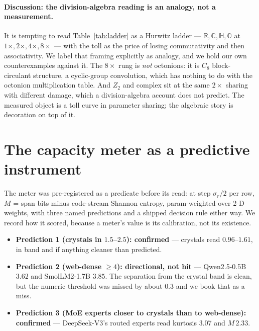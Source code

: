 \documentclass[11pt]{article}
\begin{document}
\paragraph{Discussion: the division-algebra reading is an analogy, not a
measurement.}
It is tempting to read Table~\ref{tab:ladder} as a Hurwitz ladder ---
$\mathbb{R}, \mathbb{C}, \mathbb{H}, \mathbb{O}$ at $1\times, 2\times, 4\times,
8\times$ --- with the toll as the price of losing commutativity and then
associativity. We label that framing explicitly as analogy, and we hold our own
counterexamples against it. The $8\times$ rung is \emph{not} octonions: it is
$C_8$ block-circulant structure, a cyclic-group convolution, which has nothing
to do with the octonion multiplication table. And $Z_2$ and complex sit at the
same $2\times$ sharing with different damage, which a division-algebra account
does not predict. The measured object is a toll curve in parameter sharing; the
algebraic story is decoration on top of it.

\section{The capacity meter as a predictive instrument}
\label{sec:capmeter}

The meter was pre-registered as a predicate before its read: at step
$\sigma_r/2$ per row, $M$ = span bits minus code-stream Shannon entropy,
param-weighted over 2-D weights, with three named predictions and a shipped
decision rule either way. %
We record how it scored, because a meter's value is its calibration, not its
existence.

\begin{itemize}
\item \textbf{Prediction 1 (crystals in $1.5$--$2.5$): confirmed} --- crystals
read $0.96$--$1.61$, in band and if anything cleaner than predicted.
\item \textbf{Prediction 2 (web-dense $\geq 4$): directional, not hit} ---
Qwen2.5-0.5B $3.62$ and SmolLM2-1.7B $3.85$. The separation from the crystal band
is clean, but the numeric threshold was missed by about $0.3$ and we book that
as a miss. %
\item \textbf{Prediction 3 (MoE experts closer to crystals than to web-dense):
confirmed} --- DeepSeek-V3's routed experts read kurtosis 3.07 and $M\,2.33$.
\end{itemize}
\end{document}
